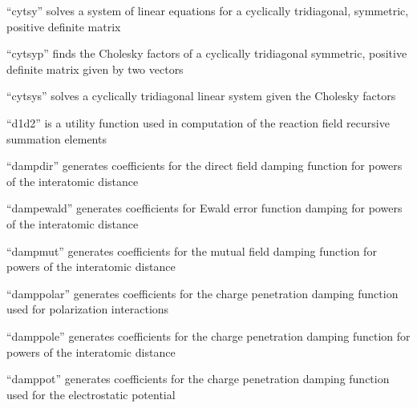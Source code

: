 \documentclass[letterpaper,11pt,english]{sphinxmanual}
\begin{document}
\sphinxAtStartPar
{}

\sphinxAtStartPar
“cytsy” solves a system of linear equations for a cyclically tridiagonal, symmetric, positive definite matrix

\sphinxAtStartPar
{}

\sphinxAtStartPar
“cytsyp” finds the Cholesky factors of a cyclically tridiagonal symmetric, positive definite matrix given by two vectors

\sphinxAtStartPar
{}

\sphinxAtStartPar
“cytsys” solves a cyclically tridiagonal linear system given the Cholesky factors

\sphinxAtStartPar
{}

\sphinxAtStartPar
“d1d2” is a utility function used in computation of the reaction field recursive summation elements

\sphinxAtStartPar
{}

\sphinxAtStartPar
“dampdir” generates coefficients for the direct field damping function for powers of the interatomic distance

\sphinxAtStartPar
{}

\sphinxAtStartPar
“dampewald” generates coefficients for Ewald error function damping for powers of the interatomic distance

\sphinxAtStartPar
{}

\sphinxAtStartPar
“dampmut” generates coefficients for the mutual field damping function for powers of the interatomic distance

\sphinxAtStartPar
{}

\sphinxAtStartPar
“damppolar” generates coefficients for the charge penetration damping function used for polarization interactions

\sphinxAtStartPar
{}

\sphinxAtStartPar
“damppole” generates coefficients for the charge penetration damping function for powers of the interatomic distance

\sphinxAtStartPar
{}

\sphinxAtStartPar
“damppot” generates coefficients for the charge penetration damping function used for the electrostatic potential
\end{document}
